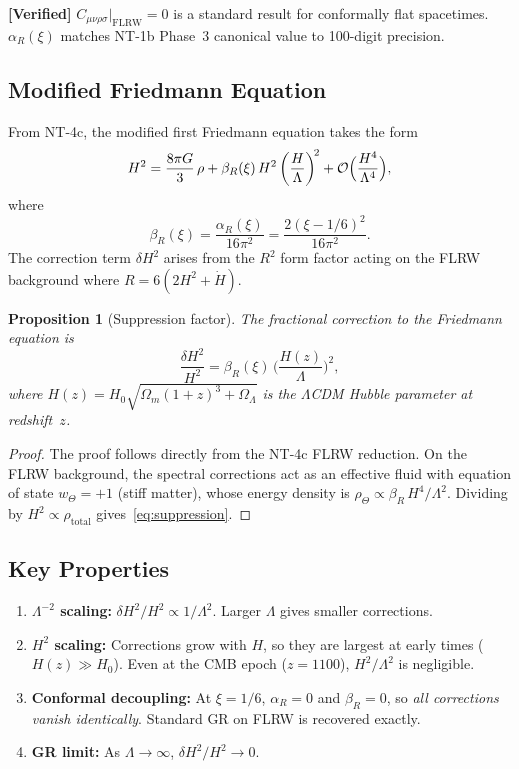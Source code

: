 \documentclass[11pt,a4paper]{article}
\newcommand{\Lam}{\Lambda}
\theoremstyle{plain}
\newtheorem{proposition}[theorem]{Proposition}
\theoremstyle{definition}
\newcommand{\verified}[1]{%
  \par\smallskip\noindent
  \colorbox{green!10}{\parbox{\dimexpr\linewidth-2\fboxsep}{%
    \textcolor{green!50!black}{\textbf{[Verified]}} #1}}%
  \par\smallskip}
\begin{document}
\verified{$C_{\mu\nu\rho\sigma}|_{\mathrm{FLRW}} = 0$ is a standard
result for conformally flat spacetimes. $\alpha_R(\xi)$ matches
NT-1b Phase~3 canonical value to 100-digit precision.}

\subsection{Modified Friedmann Equation}

From NT-4c, the modified first Friedmann equation takes the form
\begin{equation}\label{eq:friedmann-mod}
  H^2 = \frac{8\pi G}{3}\,\rho
  + \beta_R(\xi)\,H^2\,\biggl(\frac{H}{\Lam}\biggr)^{\!2}
  + \mathcal{O}\Bigl(\frac{H^4}{\Lam^4}\Bigr),
\end{equation}
where
\begin{equation}\label{eq:betaR}
  \beta_R(\xi) = \frac{\alpha_R(\xi)}{16\pi^2}
  = \frac{2(\xi - 1/6)^2}{16\pi^2}.
\end{equation}
The correction term $\delta H^2$ arises from the $R^2$ form factor
acting on the FLRW background where $R = 6(2H^2 + \dot{H})$.

\begin{proposition}[Suppression factor]\label{prop:suppression}
The fractional correction to the Friedmann equation is
\begin{equation}\label{eq:suppression}
  \frac{\delta H^2}{H^2}
  = \beta_R(\xi)\,\biggl(\frac{H(z)}{\Lam}\biggr)^{\!2},
\end{equation}
where $H(z) = H_0\sqrt{\Omega_m(1+z)^3 + \Omega_\Lam}$ is the
$\Lam$CDM Hubble parameter at redshift~$z$.
\end{proposition}

\begin{proof}
The proof follows directly from the NT-4c FLRW reduction. On the FLRW
background, the spectral corrections act as an effective fluid with
equation of state $w_\Theta = +1$ (stiff matter), whose energy density
is $\rho_\Theta \propto \beta_R\,H^4/\Lam^2$. Dividing by
$H^2 \propto \rho_{\mathrm{total}}$ gives~\eqref{eq:suppression}.
\end{proof}

\subsection{Key Properties}

\begin{enumerate}[nosep]
  \item \textbf{$\Lam^{-2}$ scaling:} $\delta H^2/H^2 \propto 1/\Lam^2$.
    Larger $\Lam$ gives smaller corrections.
  \item \textbf{$H^2$ scaling:} Corrections grow with $H$, so they are
    largest at early times ($H(z) \gg H_0$). Even at the CMB epoch
    ($z = 1100$), $H^2/\Lam^2$ is negligible.
  \item \textbf{Conformal decoupling:} At $\xi = 1/6$,
    $\alpha_R = 0$ and $\beta_R = 0$, so \emph{all corrections vanish
    identically}. Standard GR on FLRW is recovered exactly.
  \item \textbf{GR limit:} As $\Lam \to \infty$, $\delta H^2/H^2 \to 0$.
\end{enumerate}
\end{document}
